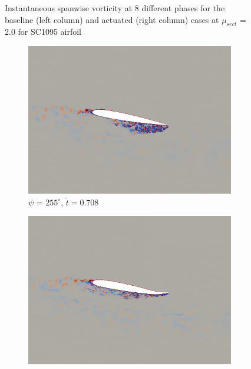 \begin{figure}[H]
	
	\caption{Instantaneous spanwise vorticity at 8 different phases for the baseline (left column) and actuated (right column) cases at $\mu_{sect}$ = 2.0 for SC1095 airfoil}
\end{figure}

\begin{figure}[H]\ContinuedFloat
	\centering
	
		\begin{subfigure}[b]{0.4\textwidth}
		\centering
		\includegraphics[width=1\textwidth]{figures/SC1095/baseline/phase_255.png}
		\caption{ $\psi$ = $255^\circ$, $\tilde{t}=0.708$}
		\label{fig:SC1095_baseline_psi255}
	\end{subfigure}
	\begin{subfigure}[b]{0.4\textwidth}
		\centering
		\includegraphics[width=1\textwidth]{figures/SC1095/AC/phase_255.png}

\end{subfigure}
\end{figure}
